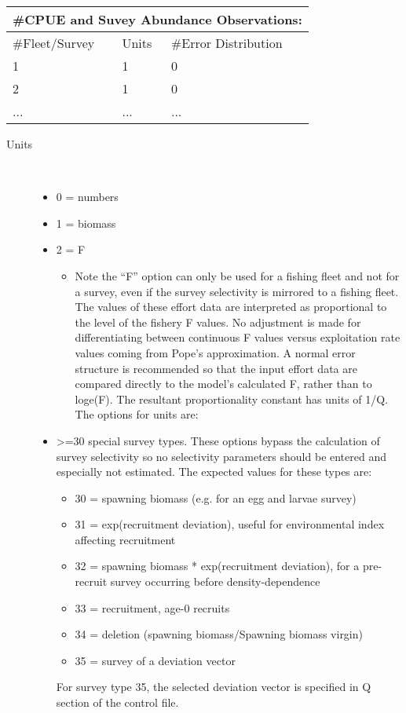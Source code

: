 \begin{center}
	\begin{tabular}{p{3cm} p{2cm} p{3cm} p{3cm} p{3cm}}
		\multicolumn{5}{l}{\#CPUE and Suvey Abundance Observations:}\\
		\hline
		\#Fleet/Survey & Units & \multicolumn{3}{l}{\#Error Distribution}\\
		\hline
		1 & 1 & \multicolumn{3}{l}{0}\\
		2 & 1 & \multicolumn{3}{l}{0}\\
		... & ... & \multicolumn{3}{l}{...}\\
		\hline
	\end{tabular}		
\end{center}
\begin{description}
	\item[Units]\hfill\\	
	\begin{itemize}
		\item 0  = numbers
		\item 1  = biomass
		\item 2  = F
		\begin{itemize}
			\item 	Note the “F” option can only be used for a fishing fleet and not for a survey, even if the survey selectivity is mirrored to a fishing fleet.  The values of these effort data are interpreted as proportional to the level of the fishery F values.  No adjustment is made for differentiating between continuous F values versus exploitation rate values coming from Pope’s approximation.  A normal error structure is recommended so that the input effort data are compared directly to the model’s calculated F, rather than to loge(F).  The resultant proportionality constant has units of 1/Q. The options for units are:	
		\end{itemize}
		\item >=30 special survey types.  These options bypass the calculation of survey selectivity so no selectivity parameters should be entered and especially not estimated.  The expected values for these types are:
		\begin{itemize}
			\item 30 = spawning biomass (e.g. for an egg and larvae survey)
			\item 31 = exp(recruitment deviation), useful for environmental index affecting recruitment
			\item 32 = spawning biomass * exp(recruitment deviation), for a pre-recruit survey occurring before density-dependence
			\item 33 = recruitment, age-0 recruits
			\item 34 = deletion (spawning biomass/Spawning biomass virgin)
			\item 35 = survey of a deviation vector
		\end{itemize}
	    For survey type 35, the selected deviation vector is specified in Q section of the control file.
	\end{itemize}
	

\end{description}
